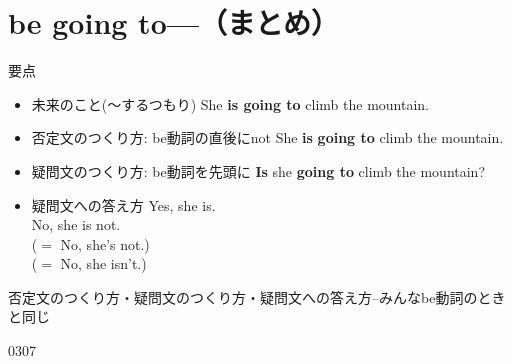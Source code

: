 \documentclass[aspectratio=169,xcolor={dvipsnames,table}]{beamer}
\newcommand{\myaudio}[1]{\href{#1}{\faVolumeUp}}
\begin{document}
\section{be going to---（まとめ）}
\begin{frame}[plain]{要点}
 
\begin{block}{}
\begin{itemize}[square]\small
 \item 未来のこと(～するつもり)%
\hfill{She {\bfseries is going to} climb the mountain.}
 \item 否定文のつくり方: be動詞の直後にnot
\hfill{}{She {\bfseries is}  {\bfseries going to} climb the mountain.}
 \item 疑問文のつくり方: be動詞を先頭に
\hfill{}{{\bfseries Is} she {\bfseries going to} climb the mountain?}
 \item 疑問文への答え方
\hfill{}Yes, she is.\\
\hfill{}No, she is not.\\
\hfill{}($=$ No, she's not.)\\
\hfill{}($=$ No, she isn't.)
\end{itemize}
\end{block}
\hfill{{\scriptsize 否定文のつくり方・疑問文のつくり方・疑問文への答え方--みんなbe動詞のときと同じ}}

\hfill{\tiny 0307}\,{\scriptsize \myaudio{./audio/011_be_going_to_10.mp3}}
\end{frame}
\end{document}
